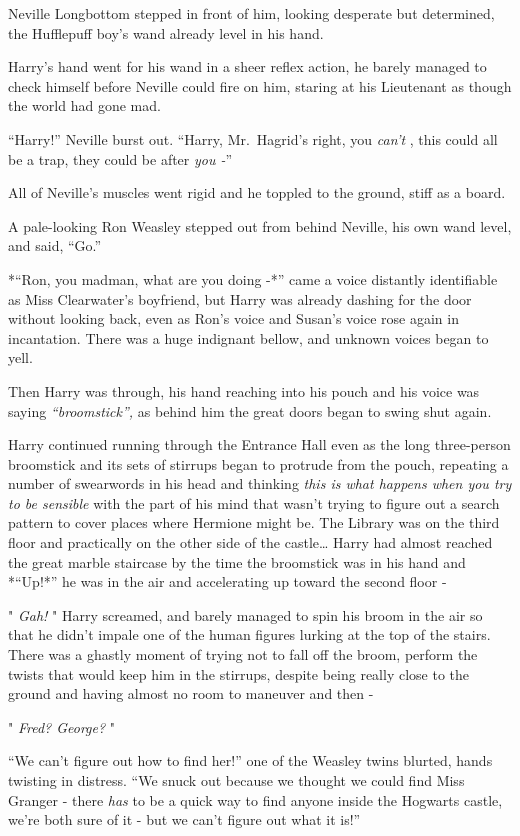 Neville Longbottom stepped in front of him, looking desperate but
determined, the Hufflepuff boy's wand already level in his hand.

Harry's hand went for his wand in a sheer reflex action, he barely
managed to check himself before Neville could fire on him, staring at
his Lieutenant as though the world had gone mad.

``Harry!'' Neville burst out. ``Harry, Mr.~Hagrid's right, you
\emph{can't} , this could all be a trap, they could be after \emph{you
-}''

All of Neville's muscles went rigid and he toppled to the ground, stiff
as a board.

A pale-looking Ron Weasley stepped out from behind Neville, his own wand
level, and said, ``Go.''

*``Ron, you madman, what are you doing -*'' came a voice distantly
identifiable as Miss Clearwater's boyfriend, but Harry was already
dashing for the door without looking back, even as Ron's voice and
Susan's voice rose again in incantation. There was a huge indignant
bellow, and unknown voices began to yell.

Then Harry was through, his hand reaching into his pouch and his voice
was saying \emph{``broomstick'',} as behind him the great doors began to
swing shut again.

Harry continued running through the Entrance Hall even as the long
three-person broomstick and its sets of stirrups began to protrude from
the pouch, repeating a number of swearwords in his head and thinking
\emph{this is what happens when you try to be sensible} with the part of
his mind that wasn't trying to figure out a search pattern to cover
places where Hermione might be. The Library was on the third floor and
practically on the other side of the castle\ldots{} Harry had almost
reached the great marble staircase by the time the broomstick was in his
hand and *``Up!*'' he was in the air and accelerating up toward the
second floor -

" \emph{Gah!} " Harry screamed, and barely managed to spin his broom in
the air so that he didn't impale one of the human figures lurking at the
top of the stairs. There was a ghastly moment of trying not to fall off
the broom, perform the twists that would keep him in the stirrups,
despite being really close to the ground and having almost no room to
maneuver and then -

" \emph{Fred? George?} "

``We can't figure out how to find her!'' one of the Weasley twins
blurted, hands twisting in distress. ``We snuck out because we thought
we could find Miss Granger - there \emph{has} to be a quick way to find
anyone inside the Hogwarts castle, we're both sure of it - but we can't
figure out what it is!''

